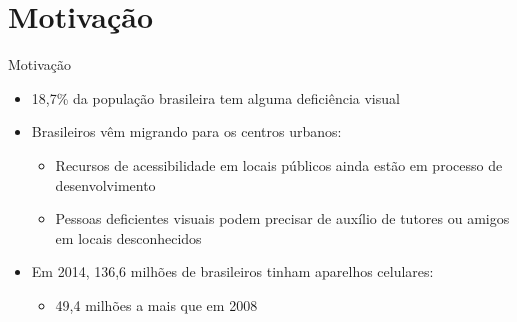 \section{Motivação}\label{sec:intro}
\begin{frame}{Motivação}
	\begin{itemize}
		\setlength{\itemsep}{1.5em}
		\item<1-> 18,7\% da população brasileira tem alguma deficiência visual
		
		\item<1-> Brasileiros vêm migrando para os centros urbanos:
		\begin{itemize}
			\setlength{\itemsep}{0.5em}
			\item<1-> Recursos de acessibilidade em locais públicos ainda estão em processo de desenvolvimento
			\item<1-> Pessoas deficientes visuais podem precisar de auxílio de tutores ou amigos em locais desconhecidos
		\end{itemize}
		
		\item<1-> Em 2014, 136,6 milhões de brasileiros tinham aparelhos celulares:
			\begin{itemize}
				\item<1-> 49,4 milhões a mais que em 2008
			\end{itemize}
	\end{itemize}
\end{frame}